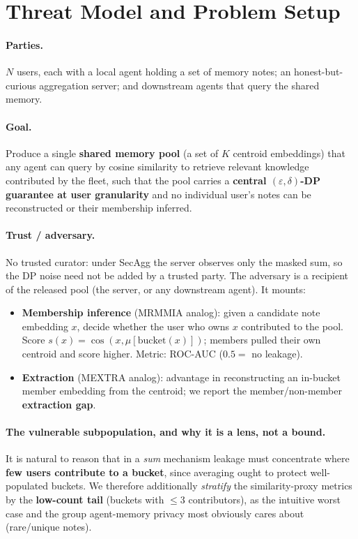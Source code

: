 \documentclass[pdflatex,sn-mathphys-num,iicol]{sn-jnl}
\theoremstyle{thmstyleone}%
\theoremstyle{thmstyletwo}%
\theoremstyle{thmstylethree}%
\newcommand{\eps}{\varepsilon}
\begin{document}
\section{Threat Model and Problem Setup}\label{sec:threat}

\paragraph{Parties.} $N$ users, each with a local agent holding a set of memory
notes; an honest-but-curious aggregation server; and downstream agents that query
the shared memory.

\paragraph{Goal.} Produce a single \textbf{shared memory pool} (a set of $K$
centroid embeddings) that any agent can query by cosine similarity to retrieve
relevant knowledge contributed by the fleet, such that the pool carries a
\textbf{central $(\eps, \delta)$-DP guarantee at user granularity} and no
individual user's notes can be reconstructed or their membership inferred.

\paragraph{Trust / adversary.} No trusted curator: under SecAgg the server
observes only the masked sum, so the DP noise need not be added by a trusted
party. The adversary is a recipient of the released pool (the server, or any
downstream agent). It mounts:
\begin{itemize}
  \item \textbf{Membership inference} (MRMMIA analog): given a candidate note
    embedding $x$, decide whether the user who owns $x$ contributed to the pool.
    Score $s(x) = \cos(x, \mu[\mathrm{bucket}(x)])$; members pulled their own
    centroid and score higher. Metric: ROC-AUC ($0.5 =$ no leakage).
  \item \textbf{Extraction} (MEXTRA analog): advantage in reconstructing an
    in-bucket member embedding from the centroid; we report the
    member/non-member \textbf{extraction gap}.
\end{itemize}

\paragraph{The vulnerable subpopulation, and why it is a lens, not a bound.} It is natural
to reason that in a \emph{sum} mechanism leakage must concentrate where \textbf{few users
contribute to a bucket}, since averaging ought to protect well-populated buckets. We therefore
additionally \emph{stratify} the similarity-proxy metrics by the \textbf{low-count tail} (buckets
with $\leq 3$ contributors), as the intuitive worst case and the group agent-memory privacy most
obviously cares about (rare/unique notes).
\end{document}
